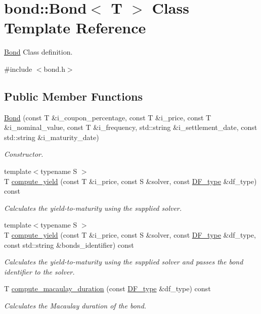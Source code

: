 \hypertarget{classbond_1_1_bond}{}\section{bond\+:\+:Bond$<$ T $>$ Class Template Reference}
\label{classbond_1_1_bond}


\hyperlink{classbond_1_1_bond}{Bond} Class definition.  




{\ttfamily \#include $<$bond.\+h$>$}

\subsection*{Public Member Functions}
\begin{DoxyCompactItemize}
\item 
\hyperlink{classbond_1_1_bond_ad61e169b5d3cad981941508bf2af6983}{Bond} (const T \&i\+\_\+coupon\+\_\+percentage, const T \&i\+\_\+price, const T \&i\+\_\+nominal\+\_\+value, const T \&i\+\_\+frequency, std\+::string \&i\+\_\+settlement\+\_\+date, const std\+::string \&i\+\_\+maturity\+\_\+date)
\begin{DoxyCompactList}\small\item\em Constructor. \end{DoxyCompactList}\item 
{\footnotesize template$<$typename S $>$ }\\T \hyperlink{classbond_1_1_bond_ab8a8cfc409d2842e8d9053e53d50468f}{compute\+\_\+yield} (const T \&i\+\_\+price, const S \&solver, const \hyperlink{namespaceutilities_ad4290e607d0651ce53db6e5c776aca7c}{D\+F\+\_\+type} \&df\+\_\+type) const
\begin{DoxyCompactList}\small\item\em Calculates the yield-\/to-\/maturity using the supplied solver. \end{DoxyCompactList}\item 
{\footnotesize template$<$typename S $>$ }\\T \hyperlink{classbond_1_1_bond_ab4dba13e68b2685eef680fe7b8155a7a}{compute\+\_\+yield} (const T \&i\+\_\+price, const S \&solver, const \hyperlink{namespaceutilities_ad4290e607d0651ce53db6e5c776aca7c}{D\+F\+\_\+type} \&df\+\_\+type, const std\+::string \&bonds\+\_\+identifier) const
\begin{DoxyCompactList}\small\item\em Calculates the yield-\/to-\/maturity using the supplied solver and passes the bond identifier to the solver. \end{DoxyCompactList}\item 
T \hyperlink{classbond_1_1_bond_a57f98f3e281876089945e08457ce6bc6}{compute\+\_\+macaulay\+\_\+duration} (const \hyperlink{namespaceutilities_ad4290e607d0651ce53db6e5c776aca7c}{D\+F\+\_\+type} \&df\+\_\+type) const
\begin{DoxyCompactList}\small\item\em Calculates the Macaulay duration of the bond. \end{DoxyCompactList}\end{DoxyCompactItemize}
